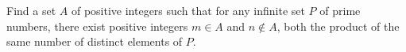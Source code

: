 Find a set $A$ of positive integers such that for any infinite set $P$ of prime numbers, there exist positive integers $m \in A$ and $n \notin A$, both the product of the same number of distinct elements of $P$.
